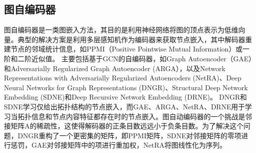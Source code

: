 \subsection{图自编码器}
图自编码器是一类图嵌入方法，其目的是利用神经网络将图的顶点表示为低维向量。典型的解决方案是利用多层感知机作为编码器来获取节点嵌入，其中解码器重建节点的邻域统计信息，如PPMI（Positive Pointwise Mutual Information）或一阶和二阶近似值。
主要包括基于GCN的自编码器，如Graph Autoencoder（GAE）\cite{kipf2016variational}和Adversarially Regularized Graph Autoencoder (ARGA）\cite{pan2018adversarially}，以及Network Representations with Adversarially Regularized Autoencoders (NetRA)\cite{yu2018learning}、Deep Neural Networks for Graph Representations (DNGR)\cite{cao2016deep}、Structural Deep Network Embedding (SDNE)\cite{wang2016structural}和Deep Recursive Network Embedding (DRNE)\cite{tu2018deep}。
DNGR和SDNE学习仅给出拓扑结构的节点嵌入，而GAE、ARGA、NetRA、DRNE用于学习当拓扑信息和节点内容特征都存在时的节点嵌入。图自动编码器的一个挑战是邻接矩阵A的稀疏性，这使得解码器的正条目数远远小于负条目数。为了解决这个问题，DNGR重构了一个更密集的矩阵，即PPMI矩阵，SDNE对邻接矩阵的零项进行惩罚，GAE对邻接矩阵中的项进行重加权，NetRA将图线性化为序列。
